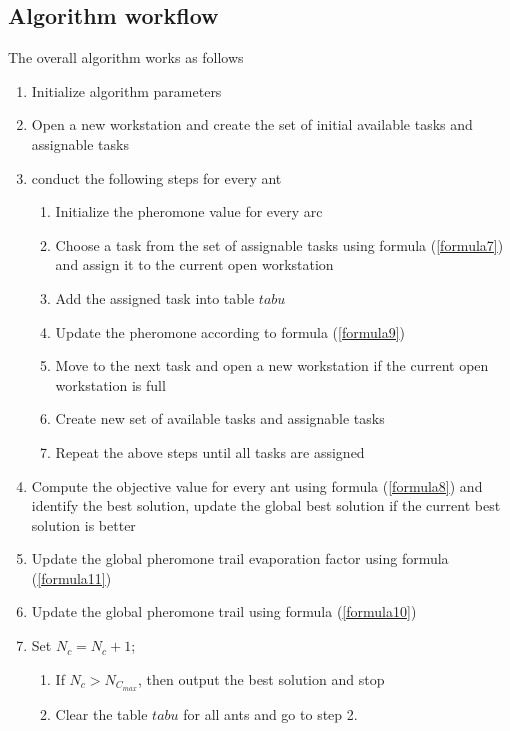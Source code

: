 \subsection{Algorithm workflow}
The overall algorithm works as follows
\begin{enumerate}
	\item Initialize algorithm parameters
	\item Open a new workstation and create the set of initial available tasks and assignable tasks
	\item conduct the following steps for every ant
	\begin{enumerate}
		\item Initialize the pheromone value for every arc
		\item Choose a task from the set of assignable tasks using formula (\ref{formula7}) and assign it to the current open workstation
		\item Add the assigned task into table $tabu$
		\item Update the pheromone according to formula (\ref{formula9})
		\item Move to the next task and open a new workstation if the current open workstation is full
		\item Create new set of available tasks and assignable tasks
		\item Repeat the above steps until all tasks are assigned
	\end{enumerate}
	\item Compute the objective value for every ant using formula (\ref{formula8}) and identify the best solution, update the global best solution if the current best solution is better
	\item Update the global pheromone trail evaporation factor using formula (\ref{formula11})
	\item Update the global pheromone trail using formula (\ref{formula10})
	\item Set $N_c = N_c + 1$; 
	\begin{enumerate}
		\item If $N_c > N_{C_{max}}$, then output the best solution and stop
		\item Clear the table $tabu$ for all ants and go to step 2.
	\end{enumerate}
\end{enumerate}
